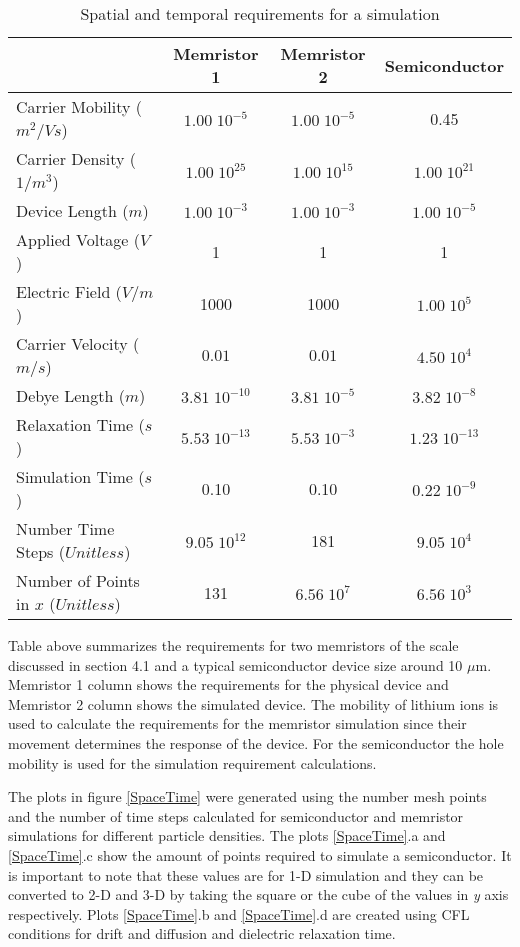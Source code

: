 \begin{doublespace}
\begin{table}
\begin{center}
  \begin{tabular}{ l | c | c | c }
    \hline
      & Memristor 1 & Memristor 2& Semiconductor \\ \hline
    Carrier Mobility ($m^2/Vs$)& $1.00\;10^{-5}$& $1.00\;10^{-5}$ & 0.45 \\ \hline
     Carrier Density ($1/m^3$)& $1.00\;10^{25}$ & $1.00\;10^{15}$&$1.00\;10^{21}$ \\ \hline
    Device Length ($m$) & $1.00\;10^{-3}$& $1.00\;10^{-3}$ & $1.00\;10^{-5}$ \\ \hline
    Applied Voltage ($V$) & 1 & 1 & 1 \\ \hline
     Electric Field ($V/m$) & 1000 & 1000&$1.00\;10^{5}$ \\ \hline
    Carrier Velocity ($m/s$) & $0.01$ & $0.01$ &$4.50\;10^{4}$ \\ \hline
      Debye Length ($m$) & $3.81\;10^{-10}$ &$3.81\;10^{-5}$ & $3.82\;10^{-8}$ \\  \hline
    Relaxation Time ($s$) & $5.53\;10^{-13}$ & $5.53\;10^{-3}$ &$1.23\;10^{-13}$ \\  \hline
    Simulation Time ($s$) & 0.10 &  0.10 & $0.22\;10^{-9}$ \\  \hline
    Number Time Steps ($Unitless$) & $9.05\; 10^{12}$& 181 & $9.05\; 10^4$ \\  \hline
     Number of Points in $x$ ($Unitless$) & 131 &$6.56\; 10^7$  &  $6.56\; 10^3$   
  \end{tabular}
      \caption{Spatial and temporal requirements for a simulation} 
\end{center}
\end{table}
Table above summarizes the requirements for two memristors of the scale discussed in section 4.1 and a typical semiconductor device size around 10 $\mu$m. Memristor 1 column shows the requirements for the physical device and Memristor 2 column shows the simulated device. The mobility of lithium ions is used to calculate the requirements for the memristor simulation since their movement determines the response of the device. For the semiconductor the hole mobility is used for the simulation requirement calculations.

The plots in figure \ref{SpaceTime} were generated using the number mesh points and the number of time steps calculated for semiconductor and memristor simulations for different particle densities. The plots \ref{SpaceTime}.a and \ref{SpaceTime}.c show the amount of points required to simulate a semiconductor. It is important to note that these values are for 1-D simulation and they can be converted to 2-D and 3-D by taking the square or the cube of the values in \textit{y} axis respectively. Plots \ref{SpaceTime}.b and \ref{SpaceTime}.d are created using CFL conditions for drift and diffusion and dielectric relaxation time.


\end{doublespace}
